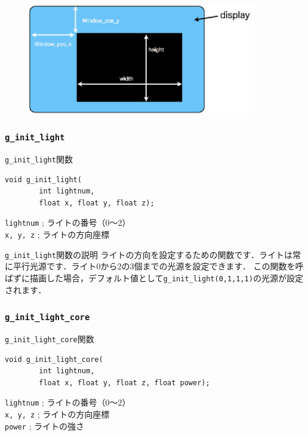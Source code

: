\documentclass[platex,a4paper,12pt]{jsarticle}%
\begin{document}
\begin{figure}[htb]
\centering
\includegraphics[width=100mm]{./Figures/eps/Canvas_g_init_core.eps}
\end{figure}


\clearpage
\subsubsection{\texttt{g\_init\_light}}

\begin{itembox}[l]{\texttt{g\_init\_light}関数}
\begin{verbatim}
void g_init_light(
        int lightnum,
        float x, float y, float z);
\end{verbatim}
\verb|lightnum| ; ライトの番号（0〜2）\\
\verb|x, y, z| ; ライトの方向座標
\end{itembox}

\begin{itembox}[l]{\texttt{g\_init\_light}関数の説明}
ライトの方向を設定するための関数です．ライトは常に平行光源です．ライト0から2の3個までの光源を設定できます．
この関数を呼ばずに描画した場合，デフォルト値として\texttt{g\_init\_light(0,1,1,1)}の光源が設定されます．
\end{itembox}

\subsubsection{\texttt{g\_init\_light\_core}}

\begin{itembox}[l]{\texttt{g\_init\_light\_core}関数}
\begin{verbatim}
void g_init_light_core(
        int lightnum,
        float x, float y, float z, float power);
\end{verbatim}
\verb|lightnum| ; ライトの番号（0〜2）\\
\verb|x, y, z| ; ライトの方向座標\\
\verb|power| ; ライトの強さ
\end{itembox}
\end{document}
